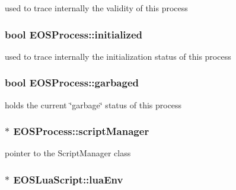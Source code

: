 used to trace internally the validity of this process 

\hypertarget{classEOSProcess_97ff1c226411207b2fe0582b1b67603b}{
\subsubsection[{initialized}]{\setlength{\rightskip}{0pt plus 5cm}bool {\bf EOSProcess::initialized}}}
\label{classEOSProcess_97ff1c226411207b2fe0582b1b67603b}


used to trace internally the initialization status of this process 

\hypertarget{classEOSProcess_a3bc6045894d86d9d64d9ad8ab610684}{
\subsubsection[{garbaged}]{\setlength{\rightskip}{0pt plus 5cm}bool {\bf EOSProcess::garbaged}}}
\label{classEOSProcess_a3bc6045894d86d9d64d9ad8ab610684}


holds the current \char`\"{}garbage\char`\"{} status of this process 

\hypertarget{classEOSProcess_86d146cc56d2a9aa68fdb6ab3ded52f0}{
\subsubsection[{scriptManager}]{$\ast$ {\bf EOSProcess::scriptManager}}}
\label{classEOSProcess_86d146cc56d2a9aa68fdb6ab3ded52f0}


pointer to the ScriptManager class 

\hypertarget{classEOSLuaScript_4417b00b43ee03bc2120f76a3bb12d07}{
\subsubsection[{luaEnv}]{$\ast$ {\bf EOSLuaScript::luaEnv}}}
\label{classEOSLuaScript_4417b00b43ee03bc2120f76a3bb12d07}


